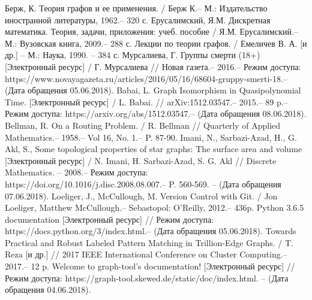 

\begin{thebibliography}{}
	  Берж, К. Теория графов и ее применения. / Берж К.-- М.: Издательство иностранной литературы, 1962.-- 320 с.
	  Ерусалимский, Я.М. Дискретная математика. Теория, задачи, приложения: учеб. пособие / Я.М. Ерусалимский.-- М.: Вузовская книга, 2009.-- 288 с.
	 Лекции по теории графов. / Емеличев В. А. [и др.] -- М.: Наука, 1990. -- 384 с.	
	  Мурсалиева, Г. Группы смерти (18+) [Электронный ресурс] / Г. Мурсалиева // Новая газета.-- 2016.-- Режим доступа: https://www.novayagazeta.ru/articles/2016/05/16/68604-gruppy-smerti-18.-- (Дата обращения 05.06.2018).
	 Babai, L. Graph Isomorphism in Quasipolynomial Time. [Электронный ресурс] / L. Babai. // arXiv:1512.03547.-- 2015.-- 89 p.-- Режим доступа: https://arxiv.org/abs/1512.03547.-- (Дата обращения 08.06.2018).
	 Bellman, R. On a Routing Problem. / R. Bellman // Quarterly of Applied Mathematics.-- 1958.-- Vol 16, No. 1.-- P. 87-90.
	  Imani, N., Sarbazi-Azad, H., G. Akl, S., Some topological properties of star graphs: The surface area and volume [Электронный ресурс] / N. Imani, H. Sarbazi-Azad, S. G. Akl // Discrete Mathematics. -- 2008.-- Режим доступа: https://doi.org/10.1016/j.disc.2008.08.007.-- P. 560-569. -- (Дата обращения 07.06.2018).
	 Loeliger, J., McCullough, M. Version Control with Git. / Jon Loeliger, Matthew McCullough.-- Sebastopol: O'Reilly, 2012.-- 436p.
	 Python 3.6.5 documentation [Электронный ресурс] // Режим доступа: https://docs.python.org/3/index.html.-- (Дата обращения 05.06.2018).
	  Towards Practical and Robust Labeled Pattern Matching in Trillion-Edge Graphs. / T. Reza [и др.] // 2017 IEEE International Conference on Cluster Computing.-- 2017.-- 12 p.
	 Welcome to graph-tool’s documentation! [Электронный ресурс] // Режим доступа: https://graph-tool.skewed.de/static/doc/index.html. -- (Дата обращения 04.06.2018).
\end{thebibliography}
